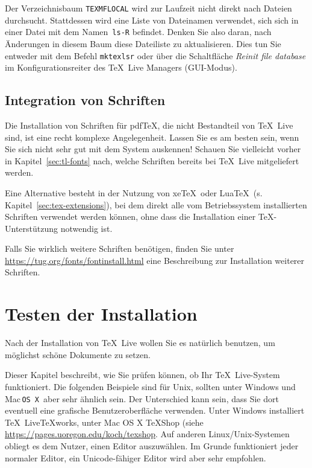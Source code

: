 \documentclass[12pt,ngerman,a4paper,fullparskip]{report}
\newcommand{\TL}{\TeX\ Live\xspace}
\newcommand{\acro}[1]{\texttt{#1}}
\newcommand{\cmdname}[1]{\texttt{#1}}
\newcommand{\filename}[1]{\texttt{#1}}
\newcommand{\dirname}[1]{\texttt{#1}}
\providecommand*{\MacOSX}{Mac\,\acro{OS\,X}\xspace}
\providecommand*{\XeTeX}{xe\TeX\xspace}
\begin{document}
Der Verzeichnisbaum \dirname{TEXMFLOCAL} wird zur Laufzeit nicht direkt nach Dateien durchsucht. Stattdessen wird eine Liste von Dateinamen verwendet, sich sich in einer Datei mit dem Namen~\filename{ls-R} befindet. Denken Sie also daran, nach Änderungen in diesem Baum diese Dateiliste zu aktualisieren. Dies tun Sie
entweder mit dem Befehl \cmdname{mktexlsr} oder über die Schaltfläche \emph{Reinit file database} im Kon\-fi\-gu\-rations\-reiter des \TeX\ Live Managers (GUI-Modus).

\subsection{Integration von Schriften}

Die Installation von Schriften für pdf\TeX, die nicht Bestandteil von \TL sind, ist eine recht komplexe Angelegenheit. Lassen Sie es am besten sein, wenn Sie sich nicht sehr gut mit dem System auskennen! Schauen Sie vielleicht vorher in Kapitel~\ref{sec:tl-fonts} nach, welche Schriften bereits bei \TL mitgeliefert werden.

Eine Alternative besteht in der Nutzung von \XeTeX\ oder Lua\TeX\ (s.\,Kapitel~\ref{sec:tex-extensions}), bei dem direkt alle vom Betriebssystem installierten Schriften verwendet werden können, ohne dass die Installation einer \TeX-Unterstützung notwendig ist.

Falls Sie wirklich weitere Schriften benötigen, finden Sie unter \url{https://tug.org/fonts/fontinstall.html} eine Beschreibung zur
Installation weiterer Schriften.

\section{Testen der Installation}
\label{sec:test-install}


Nach der Installation von \TL wollen Sie es natürlich benutzen, um möglichst schöne Dokumente zu setzen.

Dieser Kapitel beschreibt, wie Sie prüfen können, ob Ihr \TL-System funktioniert.
Die folgenden Beispiele sind für Unix, sollten unter Windows und \MacOSX\ aber sehr ähnlich sein. Der Unterschied kann sein, dass Sie dort eventuell eine grafische Benutzeroberfläche verwenden. 
Unter Windows installiert \TL \TeX works, unter Mac OS X \TeX Shop (siehe \url{https://pages.uoregon.edu/koch/texshop}.  Auf anderen Linux/Unix-Systemen obliegt es dem Nutzer, einen Editor auszuwählen. 
Im Grunde funktioniert jeder normaler Editor, ein Unicode-fähiger Editor wird aber sehr empfohlen.
\end{document}
